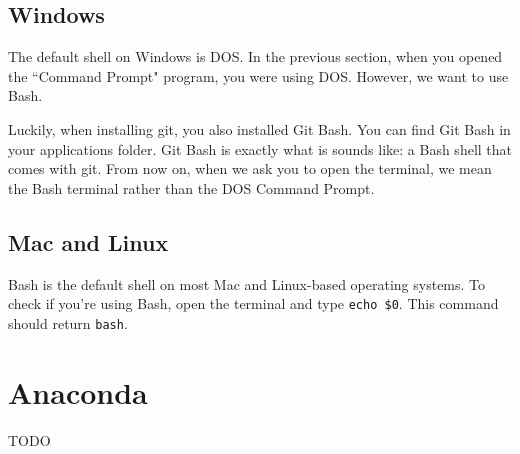\documentclass[12pt]{article}
\numberwithin{equation}{section}
\begin{document}
	\subsection{Windows}
	The default shell on Windows is DOS.  In the previous section, when you opened the ``Command Prompt" program, you were using DOS. However, we want to use Bash.
	
	Luckily, when installing git, you also installed Git Bash. You can find Git Bash in your applications folder. Git Bash is exactly what is sounds like: a Bash shell that comes with git. From now on, when we ask you to open the terminal, we mean the Bash terminal rather than the DOS Command Prompt.
	
	\subsection{Mac and Linux}
	Bash is the default shell on most Mac and Linux-based operating systems. To check if you're using Bash, open the terminal and type \verb|echo $0|. This command should return \verb|bash|. 
	
	\section{Anaconda}
	
	TODO
\end{document}
